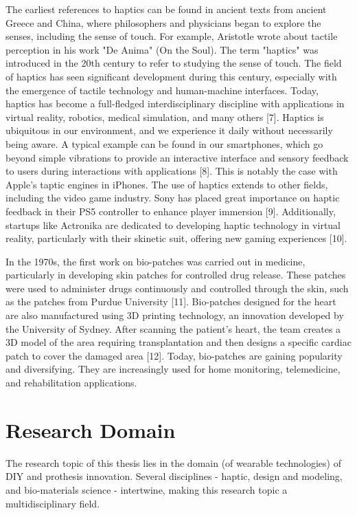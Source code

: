 The earliest references to haptics can be found in ancient texts from ancient Greece and China, where philosophers and physicians began to explore the senses, including the sense of touch. For example, Aristotle wrote about tactile perception in his work "De Anima" (On the Soul). The term "haptics" was introduced in the 20th century to refer to studying the sense of touch. The field of haptics has seen significant development during this century, especially with the emergence of tactile technology and human-machine interfaces. Today, haptics has become a full-fledged interdisciplinary discipline with applications in virtual reality, robotics, medical simulation, and many others [7]. Haptics is ubiquitous in our environment, and we experience it daily without necessarily being aware. A typical example can be found in our smartphones, which go beyond simple vibrations to provide an interactive interface and sensory feedback to users during interactions with applications [8]. This is notably the case with Apple's taptic engines in iPhones. The use of haptics extends to other fields, including the video game industry. Sony has placed great importance on haptic feedback in their PS5 controller to enhance player immersion [9]. Additionally, startups like Actronika are dedicated to developing haptic technology in virtual reality, particularly with their skinetic suit, offering new gaming experiences [10].

In the 1970s, the first work on bio-patches was carried out in medicine, particularly in developing skin patches for controlled drug release. These patches were used to administer drugs continuously and controlled through the skin, such as the patches from Purdue University [11]. Bio-patches designed for the heart are also manufactured using 3D printing technology, an innovation developed by the University of Sydney. After scanning the patient's heart, the team creates a 3D model of the area requiring transplantation and then designs a specific cardiac patch to cover the damaged area [12]. Today, bio-patches are gaining popularity and diversifying. They are increasingly used for home monitoring, telemedicine, and rehabilitation applications.

\section{Research Domain}
The research topic of this thesis lies in the domain (of wearable technologies) of DIY and prothesis innovation. Several disciplines - haptic, design and modeling, and bio-materials science - intertwine, making this research topic a multidisciplinary field.

